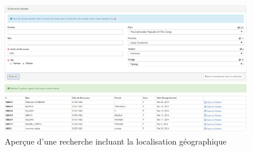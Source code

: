 \documentclass[12pt,a4paper]{report}
\begin{document}
\begin{figure}[h]
\begin{center}
\includegraphics[width=11cm]{pic/RechercheDetGeo.png}
\end{center}
\caption{Aperçue d'une recherche incluant la localisation géographique}
\label{Aperçue d'une recherche incluant la localisation géographique}
\end{figure} 
 




\tableofcontents
\end{document}

